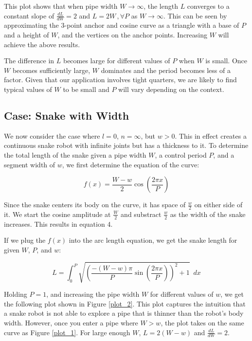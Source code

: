 This plot shows that when pipe width $W \to \infty$, the length $L$ converges to a constant slope of $\frac{dL}{dW} = 2$ and $L = 2W \,, \forall P$ as $W \to \infty$.  This can be seen by approximating the 3-point anchor and cosine curve as a triangle with a base of $P$ and a height of $W$, and the vertices on the anchor points.  Increasing $W$ will achieve the above results.

The difference in $L$ becomes large for different values of $P$ when $W$ is small.  Once $W$ becomes sufficiently large, $W$ dominates and the period becomes less of a factor.   Given that our application involves tight quarters, we are likely to find typical values of $W$ to be small and $P$ will vary depending on the context.

\subsection{Case: Snake with Width}

We now consider the case where $l = 0$, $n = \infty$, but $w > 0$.   This in effect creates a continuous snake robot with infinite joints but has a thickness to it.  To determine the total length of the snake given a pipe width $W$, a control period $P$, and a segment width of $w$, we first determine the equation of the curve:

\begin{equation}
f(x) =  \frac{W-w}{2} \cos \left( \frac{2 \pi x}{P} \right) 
\end{equation}

Since the snake centers its body on the curve, it has space of $\frac{w}{2}$ on either side of it.  We start the cosine amplitude at $\frac{W}{2}$ and substract $\frac{w}{2}$ as the width of the snake increases.  This results in equation 4.

If we plug the $f(x)$ into the arc length equation, we get the snake length for given $W$, $P$, and $w$:

\begin{equation}
L = \int_{0}^{P} \sqrt{\left( \frac{-(W-w) \pi}{P} \sin \left( \frac{2 \pi x}{P} \right)  \right)^2 + 1} \,\,\, dx
\end{equation}

Holding $P = 1$, and increasing the pipe width $W$ for different values of $w$, we get the following plot shown in Figure \ref{plot_2}.  This plot captures the intuition that a snake robot is not able to explore a pipe that is thinner than the robot's body width.  However, once you enter a pipe where $W > w$, the plot takes on the same curve as Figure \ref{plot_1}.  For large enough $W$,  $L = 2(W-w)$ and $\frac{dL}{dW} = 2$.

